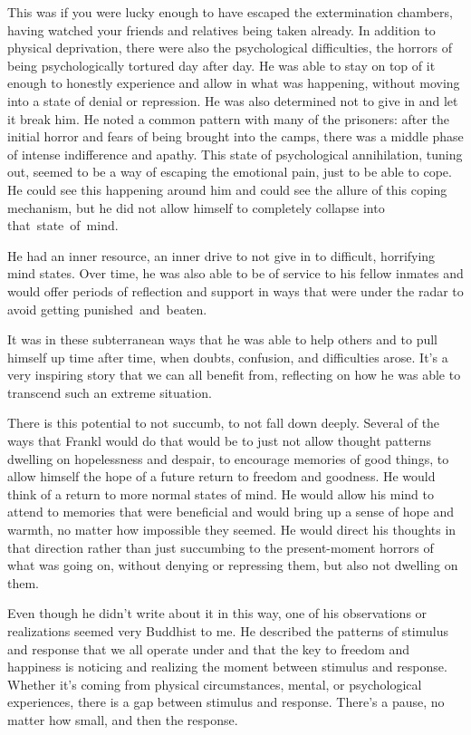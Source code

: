 This was if you were lucky enough to have escaped the extermination chambers, having watched your friends and relatives being taken already. In addition to physical deprivation, there were also the psychological difficulties, the horrors of being psychologically tortured day after day. He was able to stay on top of it enough to honestly experience and allow in what was happening, without moving into a state of denial or repression. He was also determined not to give in and let it break him. He noted a common pattern with many of the prisoners: after the initial horror and fears of being brought into the camps, there was a middle phase of intense indifference and apathy. This state of psychological annihilation, tuning out, seemed to be a way of escaping the emotional pain, just to be able to cope. He could see this happening around him and could see the allure of this coping mechanism, but he did not allow himself to completely collapse into \mbox{that state of mind.}

He had an inner resource, an inner drive to not give in to difficult, horrifying mind states. Over time, he was also able to be of service to his fellow inmates and would offer periods of reflection and support in ways that were under the radar to avoid getting \mbox{punished and beaten.}

It was in these subterranean ways that he was able to help others and to pull himself up time after time, when doubts, confusion, and difficulties arose. It's a very inspiring story that we can all benefit from, reflecting on how he was able to transcend such an extreme situation.

There is this potential to not succumb, to not fall down deeply. Several of the ways that Frankl would do that would be to just not allow thought patterns dwelling on hopelessness and despair, to encourage memories of good things, to allow himself the hope of a future return to freedom and goodness. He would think of a return to more normal states of mind. He would allow his mind to attend to memories that were beneficial and would bring up a sense of hope and warmth, no matter how impossible they seemed. He would direct his thoughts in that direction rather than just succumbing to the present-moment horrors of what was going on, without denying or repressing them, but also not dwelling on them.

Even though he didn't write about it in this way, one of his observations or realizations seemed very Buddhist to me. He described the patterns of stimulus and response that we all operate under and that the key to freedom and happiness is noticing and realizing the moment between stimulus and response. Whether it's coming from physical circumstances, mental, or psychological experiences, there is a gap between stimulus and response. There's a pause, no matter how small, and then the response.

